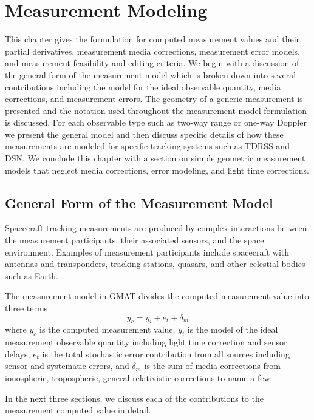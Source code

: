 
\chapter{Measurement Modeling} \label{Ch:MeasurementModelling}

This chapter gives the formulation for computed measurement values
and their partial derivatives, measurement media corrections,
measurement error models, and measurement feasibility and editing
criteria. We begin with a discussion of the general form of the
measurement model which is broken down into several contributions
including the model for the ideal observable quantity, media
corrections, and measurement errors.   The geometry of a generic measurement is presented
and the notation used throughout the measurement model formulation is discussed. For each observable type such
as two-way range or one-way Doppler we present the general model and then discuss specific
details of how these measurements are modeled for specific tracking systems such as TDRSS and DSN.
We conclude this chapter with a section on simple geometric measurement
models that neglect media corrections, error modeling, and light time corrections.

\section{General Form of the Measurement Model}

Spacecraft tracking measurements are produced by complex
interactions between the measurement participants, their associated
sensors, and the space environment.  Examples of measurement
participants include spacecraft with antennas and transponders, tracking stations,
quasars, and other celestial bodies such as Earth.

The measurement model in GMAT divides the computed measurement value
into three terms
%
\begin{equation}
    y_c = y_i + e_t + \delta_m
\end{equation}
%
where $y_c$ is the computed measurement value,
 $y_i$ is the  model of the ideal measurement observable quantity including light time correction and sensor delays,
$e_t$ is the  total stochastic error contribution from all sources including sensor and systematic errors, and
$\delta_m$ is the sum of media corrections from ionospheric, tropospheric, general relativistic corrections to name a few.

In the next three sections, we discuss each of the contributions to
the measurement computed value in  detail.


